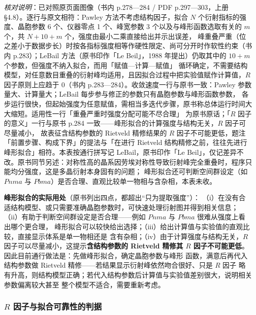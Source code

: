 \emph{核对说明}：已对照原页面图像（书内 p.278—284 / PDF p.297—303，上册 §4.8）。逐行与原文相符：Pawley 方法不考虑结构因子，拟合 $N$ 个衍射指标的强度、晶胞参数 6 个、仪器零点 1
个、峰宽参数 3 个以及与峰形函数选取有关的 $m$ 个，共 $N+10+m$ 个，强度由最小二乘直接给出并示出误差，
峰重叠严重（位之差小于数据步长）时按各指标强度相等作硬性限定、尚可分开时作软性约束（书内 p.283）；LeBail
方法（原书印作「Le Beil」，1988 年提出）仍取其中的 $10+m$ 个参数，但强度不纳入拟合，而用「赋值—计算—赋值」
循环确定，不需要结构模型，对任意数目重叠的衍射峰均适用，且因拟合过程中把实验值赋作计算值，$R$ 因子原则上应趋于
0（书内 p.283—284）。收敛速度一行与原书一致：Pawley 参数量大、计算量大；LeBail 每步参与修正的参数只有晶胞参数与峰形函数参数，
各步运行很快，但起始强度为任意赋值，需相当多迭代步骤，原书称总体运行时间大大缩短。适用性一行「重叠严重时强度分配可能不尽合理」
为原书原话；「$R$ 因子的意义」一行与原书 p.284 一致——峰形拟合的计算强度与结构无关，$R$ 因子可尽量减小，
故表征含结构参数的 Rietveld 精修结果的 $R$ 因子不可能更低，题注「前置步骤、构成下界」的提法与「在进行
Rietveld 结构精修之前，往往先进行峰形拟合」相符。本表按通行拼写记 LeBail，原书印作「Le Beil」，仅记差异不改。原书同节另述：对称性高的晶系因劳埃对称性导致衍射峰完全重叠时，程序只能均分强度，这是多晶衍射本身固有的问题；
峰形拟合还可判断空间群设定（如 $Pnma$ 与 $Pbma$）是否合理、直观比较单一物相与含杂相，本表未收。


\begin{dataflow}
\textbf{峰形拟合的实际用处}（原书列出四点，都超出``只为提取强度''）：
（i）在没有合适结构模型、或只需要准确晶胞参数时，可快速处理衍射图并得到相关信息；
（ii）有助于判断空间群设定是否合理——例如 $Pnma$ 与 $Pbma$ 很难从强度上看出哪个更合理，
峰形拟合可以较快给出选择；（iii）给出计算值与实验值的直观比较，直接显示体系是单一物相还是
含有杂相；（iv）由于计算强度与结构无关，$R$ 因子可以尽量减小，这提示\textbf{含结构参数的
Rietveld 精修其 $R$ 因子不可能更低}。因此目前通行做法是：先做峰形拟合，确定晶胞参数与峰形
函数，满意后再代入结构参数做 Rietveld 精修——若结果显示衍射峰依然吻合很好、只是 $R$ 因子
略有升高，则结构模型正确；若代入结构参数后计算值与实验值差别很大，说明相关参数偏离较大甚至
整个模型不适合，需要重新考虑。
\end{dataflow}

\subsubsection{$R$ 因子与拟合可靠性的判据}

